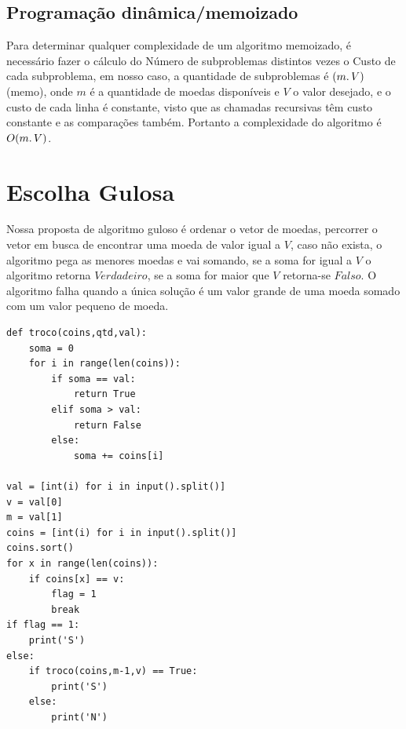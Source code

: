 \documentclass[12pt]{article}
\begin{document}
\subsection{Programação dinâmica/memoizado}
Para determinar qualquer complexidade de um algoritmo memoizado, é necessário fazer o cálculo do Número de subproblemas distintos vezes o Custo de cada subproblema, em nosso caso, a quantidade de subproblemas é $(m \ldotp V)$ (memo), onde $m$ é a quantidade de moedas disponíveis e $V$ o valor desejado, e o custo de cada linha é constante, visto que as chamadas recursivas têm custo constante e as comparações também. Portanto a complexidade do algoritmo é $O(m \ldotp V)$.
\section{Escolha Gulosa}
Nossa proposta de algoritmo guloso é ordenar o vetor de moedas, percorrer o vetor em busca de encontrar uma moeda de valor igual a $V$, caso não exista, o algoritmo pega as menores moedas e vai somando, se a soma for igual a $V$ o algoritmo retorna $Verdadeiro$, se a soma for maior que $V$ retorna-se $Falso$. O algoritmo falha quando a única solução é um valor grande de uma moeda somado com um valor pequeno de moeda.
\begin{lstlisting}
def troco(coins,qtd,val):
	soma = 0
	for i in range(len(coins)):
		if soma == val:
			return True			
		elif soma > val:
			return False
		else:
			soma += coins[i]						

val = [int(i) for i in input().split()]
v = val[0]
m = val[1]
coins = [int(i) for i in input().split()]
coins.sort()
for x in range(len(coins)):
	if coins[x] == v:
		flag = 1
		break
if flag == 1:
	print('S')
else:
	if troco(coins,m-1,v) == True:
		print('S')
	else:
		print('N')

\end{lstlisting} 
\end{document}
